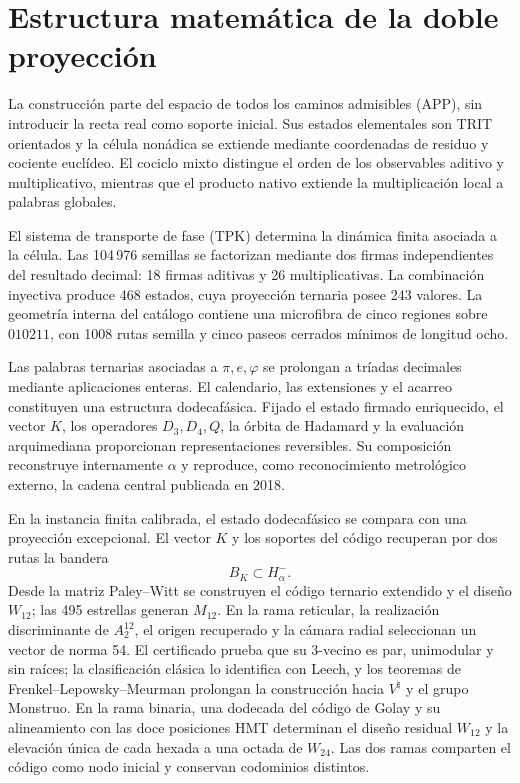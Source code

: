 \chapter{Estructura matemática de la doble proyección}
\label{chap:sintesis-hmt}

La construcción parte del espacio de todos los caminos admisibles (APP), sin
introducir la recta real como soporte inicial. Sus estados elementales son
TRIT orientados y la célula nonádica se extiende mediante coordenadas de
residuo y cociente euclídeo. El cociclo mixto distingue el orden de los
observables aditivo y multiplicativo, mientras que el producto nativo
extiende la multiplicación local a palabras globales.

El sistema de transporte de fase (TPK) determina la dinámica finita asociada
a la célula. Las 104\,976 semillas se factorizan mediante dos firmas
independientes del resultado decimal: 18 firmas aditivas y 26 multiplicativas.
La combinación inyectiva produce 468 estados, cuya proyección ternaria posee
243 valores. La geometría interna del catálogo contiene una microfibra de
cinco regiones sobre \(010211\), con 1008 rutas semilla y cinco paseos cerrados mínimos
de longitud ocho.

Las palabras ternarias asociadas a \(\pi,e,\varphi\) se prolongan a tríadas
decimales mediante aplicaciones enteras. El calendario, las extensiones y el
acarreo constituyen una estructura dodecafásica. Fijado el estado firmado
enriquecido, el vector \(K\), los operadores \(D_3,D_4,Q\), la órbita de
Hadamard y la evaluación arquimediana proporcionan representaciones
reversibles. Su composición reconstruye internamente \(\alpha\) y reproduce,
como reconocimiento metrológico externo, la cadena central publicada en 2018.

En la instancia finita calibrada, el estado dodecafásico se compara con una
proyección excepcional. El vector
\(K\) y los soportes del código recuperan por dos rutas la bandera
\[
B_K\subset H^-_\alpha.
\]
Desde la matriz Paley--Witt se construyen el código ternario extendido y el
diseño \(W_{12}\); las 495 estrellas generan \(M_{12}\). En la rama
reticular, la realización discriminante de \(A_2^{12}\), el origen recuperado
y la cámara radial seleccionan un vector de norma 54. El certificado prueba
que su 3-vecino es par, unimodular y sin raíces; la clasificación clásica lo
identifica con Leech, y los teoremas de Frenkel--Lepowsky--Meurman prolongan
la construcción hacia \(V^\natural\) y el grupo Monstruo. En la rama binaria,
una dodecada del código de Golay y su alineamiento con las doce posiciones
HMT determinan el diseño residual \(W_{12}\) y la elevación única de cada
hexada a una octada de \(W_{24}\). Las dos ramas comparten el código como nodo
inicial y conservan codominios distintos.

